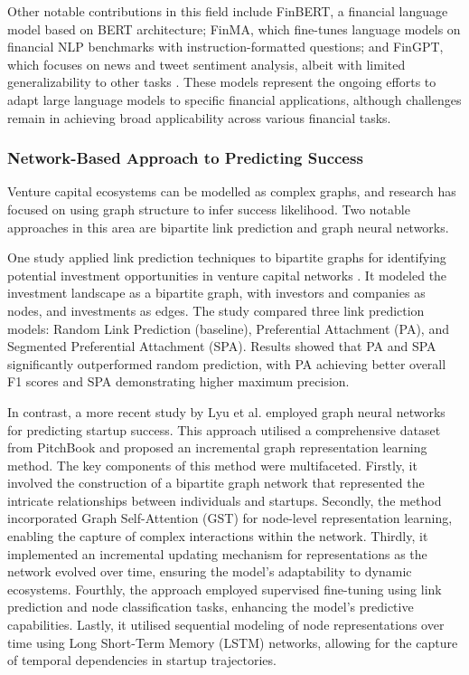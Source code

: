 \documentclass[a4paper, oneside]{discothesis}
\begin{document}
Other notable contributions in this field include FinBERT, a financial language model based on BERT architecture; FinMA, which fine-tunes language models on financial NLP benchmarks with instruction-formatted questions; and FinGPT, which focuses on news and tweet sentiment analysis, albeit with limited generalizability to other tasks \cite{araci2019finbert, liu2023finma, yang2023fingpt}. These models represent the ongoing efforts to adapt large language models to specific financial applications, although challenges remain in achieving broad applicability across various financial tasks.

\subsubsection{Network-Based Approach to Predicting Success}

Venture capital ecosystems can be modelled as complex graphs, and research has focused on using graph structure to infer success likelihood. Two notable approaches in this area are bipartite link prediction and graph neural networks.

One study applied link prediction techniques to bipartite graphs for identifying potential investment opportunities in venture capital networks \cite{predictVCbipartite}. It modeled the investment landscape as a bipartite graph, with investors and companies as nodes, and investments as edges. The study compared three link prediction models: Random Link Prediction (baseline), Preferential Attachment (PA), and Segmented Preferential Attachment (SPA). Results showed that PA and SPA significantly outperformed random prediction, with PA achieving better overall F1 scores and SPA demonstrating higher maximum precision.

In contrast, a more recent study by Lyu et al. \cite{lyu2023graph} employed graph neural networks for predicting startup success. This approach utilised a comprehensive dataset from PitchBook and proposed an incremental graph representation learning method. The key components of this method were multifaceted. Firstly, it involved the construction of a bipartite graph network that represented the intricate relationships between individuals and startups. Secondly, the method incorporated Graph Self-Attention (GST) for node-level representation learning, enabling the capture of complex interactions within the network. Thirdly, it implemented an incremental updating mechanism for representations as the network evolved over time, ensuring the model's adaptability to dynamic ecosystems. Fourthly, the approach employed supervised fine-tuning using link prediction and node classification tasks, enhancing the model's predictive capabilities. Lastly, it utilised sequential modeling of node representations over time using Long Short-Term Memory (LSTM) networks, allowing for the capture of temporal dependencies in startup trajectories.
\end{document}

